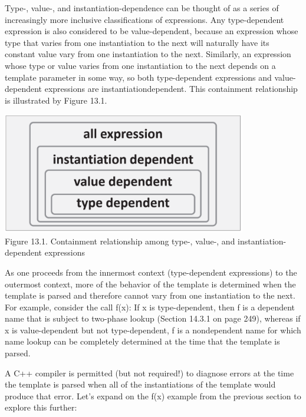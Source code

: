 Type-, value-, and instantiation-dependence can be thought of as a series of increasingly more inclusive classifications of expressions. Any type-dependent expression is also considered to be value-dependent, because an expression whose type that varies from one instantiation to the next will naturally have its constant value vary from one instantiation to the next. Similarly, an expression whose type or value varies from one instantiation to the next depends on a template parameter in some way, so both type-dependent expressions and value-dependent expressions are instantiationdependent. This containment relationship is illustrated by Figure 13.1.

\begin{center}
\includegraphics[width=0.8\textwidth]{content/2/chapter13/images/1.png} \\
Figure 13.1. Containment relationship among type-, value-, and instantiation-dependent expressions
\end{center}

As one proceeds from the innermost context (type-dependent expressions) to the outermost context, more of the behavior of the template is determined when the template is parsed and therefore cannot vary from one instantiation to the next. For example, consider the call f(x): If x is type-dependent, then f is a dependent name that is subject to two-phase lookup (Section 14.3.1 on page 249), whereas if x is value-dependent but not type-dependent, f is a nondependent name for which name lookup can be completely determined at the time that the template is parsed.


A C++ compiler is permitted (but not required!) to diagnose errors at the time the template is parsed when all of the instantiations of the template would produce that error. Let’s expand on the f(x) example from the previous section to explore this further:


